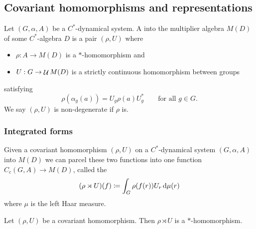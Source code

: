 \subsection{Covariant homomorphisms and representations}
\begin{definition}
Let $(G,\alpha, A)$ be a $C^*$-dynamical system. A  into the multiplier algebra $M(D)$ of some $C^*$-algebra $D$ is a pair $(\rho, U)$ where
\begin{itemize}
\item $\rho: A\to M(D)$ is a $*$-homomorphism and
\item $U: G\to \mathop{\mathcal{U}}\nolimits M(D)$ is a strictly continuous homomorphism between groups
\end{itemize}
satisfying
\[ \rho(\alpha_g(a))= U_g\rho(a)U_{g}^* \qquad \text{for all $g\in G$.} \]
We say $(\rho, U)$ is non-degenerate if $\rho$ is.
\end{definition}

\subsubsection{Integrated forms}
\begin{definition}
Given a covariant homomorphism $(\rho, U)$ on a $C^*$-dynamical system $(G,\alpha, A)$ into $M(D)$ we can parcel these two functions into one function $C_c(G,A)\to M(D)$, called the 
\[ (\rho \rtimes U) (f)  \coloneqq \int_G\rho(f(r))U_r \operatorname{d \!}\mu(r) \]
where $\mu$ is the left Haar measure.
\end{definition}
\begin{lemma}
Let $(\rho, U)$ be a covariant homomorphism. Then $\rho \rtimes U$ is a $*$-homomorphism.
\end{lemma}

